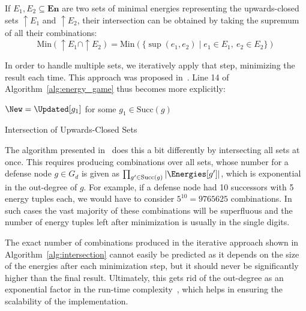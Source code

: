 If $E_1, E_2 \subseteq \mathbf{En}$ are two sets of minimal energies
representing the upwards-closed sets $\uparrow E_1$ and $\uparrow E_2$,
their intersection can be obtained by taking the supremum of all their combinations:
\begin{equation*}
    \mathrm{Min} (\uparrow E_1 \cap \uparrow E_2 ) =
    \mathrm{Min} (\{ \sup(e_1, e_2) \mid e_1 \in E_1,\ e_2 \in E_2 \})
\end{equation*}

In order to handle multiple sets, we iteratively apply that step,
minimizing the result each time.
This approach was proposed in~\cite{brihaye2023multi}.
Line 14 of Algorithm~\ref{alg:energy_game} thus becomes more explicitly:

\begin{algorithm}[H]\label{alg:intersection}
    \DontPrintSemicolon

    $\New = \Updated[g_1]$ for some $g_1 \in \mathrm{Succ}(g)$\;

    \caption{Intersection of Upwards-Closed Sets}
\end{algorithm}

The algorithm presented in~\cite{bisping2023process} does this a bit
differently by intersecting all sets at once.
This requires producing combinations over all sets,
whose number for a defense node $g \in G_d$ is given as
$\prod_{g' \in \mathrm{Succ}(g)} |\Energies[g']|$,
which is exponential in the out-degree of $g$.
For example, if a defense node had 10 successors with 5 energy tuples each,
we would have to consider $5^{10} = 9765625$ combinations.
In such cases the vast majority of these combinations will be superfluous and 
the number of energy tuples left after minimization is usually in the single
digits.

The exact number of combinations produced in the iterative approach shown in
Algorithm~\ref{alg:intersection} cannot easily be predicted as it depends on
the size of the energies after each minimization step,
but it should never be significantly higher than the final result.
Ultimately, this gets rid of the out-degree as an exponential factor in the
run-time complexity~\cite{brihaye2023multi},
which helps in ensuring the scalability of the implementation.

